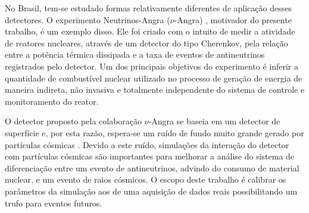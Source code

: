 No Brasil, tem-se estudado formas relativamente diferentes de aplicação  desses detectores. O experimento Neutrinos-Angra ($\nu$-Angra) \cite{anjos2012status, anjos2015using}, motivador do presente trabalho, é um exemplo disso. Ele foi criado com o intuito de medir a atividade de reatores nucleares, através de um detector do tipo Cherenkov, pela relação entre a  potência térmica dissipada e a taxa de eventos de antineutrinos registrados pelo detector. Um dos principais objetivos do experimento é inferir a quantidade de combustível nuclear utilizado no processo de geração de energia de maneira indireta, não invasiva e totalmente independente do sistema de controle e monitoramento do reator. 

O detector proposto pela colaboração $\nu$-Angra se baseia em um detector de superfície e, por esta razão, espera-se um ruído de fundo muito grande gerado por partículas cósmicas \cite{andre2010}. Devido a este ruído, simulações da interação do detector com partículas cósmicas são importantes para melhorar a análise do sistema de diferenciação entre um evento de antineutrinos, advindo do consumo de material nuclear, e um evento de raios cósmicos.
O escopo deste trabalho é calibrar os parâmetros da simulação aos de uma aquisição de dados reais possibilitando um trufo para eventos futuros.



%
%
%
%

